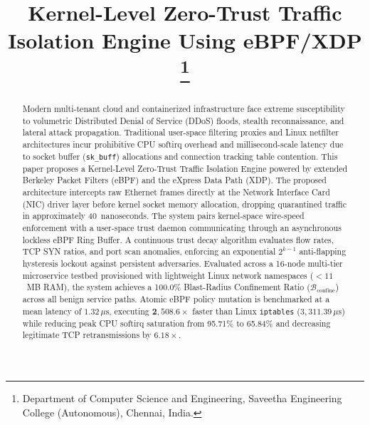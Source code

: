 \documentclass[conference]{IEEEtran}
\begin{document}
\title{Kernel-Level Zero-Trust Traffic Isolation Engine Using eBPF/XDP\\
\thanks{Department of Computer Science and Engineering, Saveetha Engineering College (Autonomous), Chennai, India.}
}

\author{
\and
{}
}

\maketitle

\begin{abstract}
Modern multi-tenant cloud and containerized infrastructure face extreme susceptibility to volumetric Distributed Denial of Service (DDoS) floods, stealth reconnaissance, and lateral attack propagation. Traditional user-space filtering proxies and Linux netfilter architectures incur prohibitive CPU softirq overhead and millisecond-scale latency due to socket buffer (\texttt{sk\_buff}) allocations and connection tracking table contention. This paper proposes a Kernel-Level Zero-Trust Traffic Isolation Engine powered by extended Berkeley Packet Filters (eBPF) and the eXpress Data Path (XDP). The proposed architecture intercepts raw Ethernet frames directly at the Network Interface Card (NIC) driver layer before kernel socket memory allocation, dropping quarantined traffic in approximately 40~nanoseconds. The system pairs kernel-space wire-speed enforcement with a user-space trust daemon communicating through an asynchronous lockless eBPF Ring Buffer. A continuous trust decay algorithm evaluates flow rates, TCP SYN ratios, and port scan anomalies, enforcing an exponential $2^{k-1}$ anti-flapping hysteresis lockout against persistent adversaries. Evaluated across a 16-node multi-tier microservice testbed provisioned with lightweight Linux network namespaces ($<11$~MB RAM), the system achieves a 100.0\% Blast-Radius Confinement Ratio ($\mathcal{B}_{\text{confine}}$) across all benign service paths. Atomic eBPF policy mutation is benchmarked at a mean latency of $1.32\,\mu\text{s}$, executing $\mathbf{2,508.6\times}$ faster than Linux \texttt{iptables} ($3,311.39\,\mu\text{s}$) while reducing peak CPU softirq saturation from 95.71\% to 65.84\% and decreasing legitimate TCP retransmissions by $6.18\times$.
\end{abstract}
\end{document}
